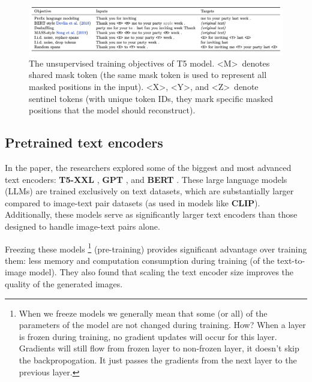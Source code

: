 \begin{figure}[h]
    \centering
    \includegraphics[width=1\textwidth]{images/imagen/t5_objectives.png}
    \caption{The unsupervised training objectives of T5 model. \textless M\textgreater\ denotes shared mask token (the same mask token is used to represent all masked positions in the input). \textless X\textgreater, \textless Y\textgreater, and \textless Z\textgreater\ denote sentinel tokens (with unique token IDs, they mark specific masked positions that the model should reconstruct).}
\end{figure}















\subsection{Pretrained text encoders}

In the paper, the researchers explored some of the biggest and most advanced text encoders: \textbf{T5-XXL} \cite{t5_model}, \textbf{GPT} \cite{gpt} \cite{mingpt} \cite{gpt_another}, and \textbf{BERT} \cite{bert}. These large language models (LLMs) are trained exclusively on text datasets, which are substantially larger compared to image-text pair datasets (as used in models like \textbf{CLIP}). Additionally, these models serve as significantly larger text encoders than those designed to handle image-text pairs alone.

Freezing these models \footnote{When we freeze models we generally mean that some (or all) of the parameters of the model are not changed during training. How? When a layer is frozen during training, no gradient updates will occur for this layer. Gradients will still flow from frozen layer to non-frozen layer, it doesn't skip the backpropogation. It just passes the gradients from the next layer to the previous layer.} (pre-training) provides significant advantage over training them: less memory and computation consumption during training (of the text-to-image model). They also found that scaling the text encoder size improves the quality of the generated images.














